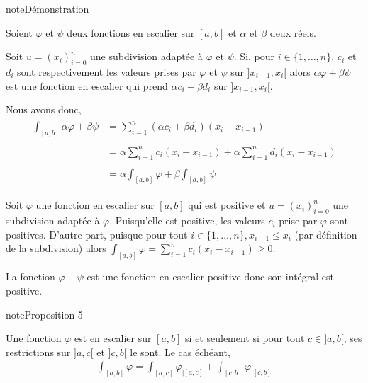 \documentclass[letterpaper,10pt,french]{jupyterBook}
\begin{document}
\begin{sphinxadmonition}{note}{Démonstration}

\sphinxhyphen{}

\sphinxAtStartPar
Soient \(\varphi\) et \(\psi\) deux fonctions en escalier sur \([a, b]\) et \(\alpha\) et \(\beta\) deux réels.

\sphinxAtStartPar
Soit \(u=(x_i)_{i=0}^n\) une subdivision adaptée à  \(\varphi\) et \(\psi\). Si, pour \(i \in \{1, \ldots, n\}\), \(c_i\) et \(d_i\) sont respectivement les valeurs prises par \(\varphi\) et \(\psi\) sur \(]x_{i-1}, x_i[\) alors \(\alpha\varphi + \beta\psi\) est une fonction en escalier qui prend \(\alpha c_i + \beta d_i\) sur \(]x_{i-1}, x_i[\).

\sphinxAtStartPar
Nous avons donc,
\begin{equation*}
\begin{split}
\begin{aligned}
\int_{[a, b]}\alpha\varphi + \beta\psi & = \sum_{i=1}^{n}(\alpha c_i + \beta d_i)(x_i-x_{i-1})   \\ \\
 & =  \alpha\sum_{i=1}^{n} c_i(x_i-x_{i-1}) +  \alpha\sum_{i=1}^{n} d_i(x_i-x_{i-1}) \\ \\
 & = \alpha\int_{[a, b]}\varphi + \beta\int_{[a, b]}\psi
\end{aligned}
\end{split}
\end{equation*}
\sphinxhyphen{}

\sphinxAtStartPar
Soit \(\varphi\) une fonction en escalier sur \([a, b]\) qui est positive et  \(u=(x_i)_{i=0}^n\) une subdivision adaptée à \(\varphi\). Puisqu’elle est positive, les valeurs \(c_i\) prise par \(\varphi\) sont positives. D’autre part, puisque pour tout \(i \in \{1, \ldots, n\}, x_{i-1} \leq x_i\) (par définition de la subdivision) alors \(\int_{[a, b]}\varphi = \sum_{i=1}^{n} c_i(x_i-x_{i-1}) \geq 0\).

\sphinxhyphen{}

\sphinxAtStartPar
La fonction \(\varphi - \psi\) est une fonction en escalier positive donc son intégral est positive.
\end{sphinxadmonition}

\begin{sphinxadmonition}{note}{Proposition 5}

\sphinxAtStartPar
Une fonction \(\varphi\) est en escalier sur \([a, b]\) si et seulement si pour tout \(c \in ]a, b[\), ses restrictions sur \(]a, c[\) et \(]c, b[\) le sont. Le cas échéant,
\begin{equation*}
\begin{split}
\int_{[a, b]}\varphi = \int_{[a, c]}\varphi_{|[a, c]} + \int_{[c, b]}\varphi_{|[c, b]}
\end{split}
\end{equation*}\end{sphinxadmonition}
\end{document}
